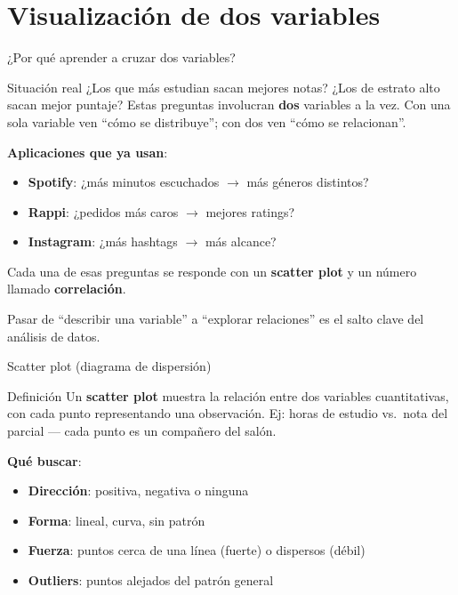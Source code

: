 \documentclass[aspectratio=169, 11pt]{beamer}
\begin{document}
\section{Visualización de dos variables}

\begin{frame}{¿Por qué aprender a cruzar dos variables?}
\begin{exampleblock}{Situación real}
¿Los que m\'as estudian sacan mejores notas? ¿Los de estrato alto sacan mejor puntaje?
Estas preguntas involucran \textbf{dos} variables a la vez.
Con una sola variable ven ``c\'omo se distribuye''; con dos ven ``c\'omo se relacionan''.
\end{exampleblock}

\textbf{Aplicaciones que ya usan}:
\begin{itemize}
\item \textbf{Spotify}: ¿m\'as minutos escuchados $\to$ m\'as g\'eneros distintos?
\item \textbf{Rappi}: ¿pedidos m\'as caros $\to$ mejores ratings?
\item \textbf{Instagram}: ¿m\'as hashtags $\to$ m\'as alcance?
\end{itemize}

\vspace{0.3em}
Cada una de esas preguntas se responde con un \textbf{scatter plot} y un n\'umero llamado \textbf{correlaci\'on}.

\vspace{0.3em}
\alert{Pasar de ``describir una variable'' a ``explorar relaciones'' es el salto clave del an\'alisis de datos.}
\end{frame}

\begin{frame}{Scatter plot (diagrama de dispersión)}
\begin{block}{Definición}
Un \textbf{scatter plot} muestra la relaci\'on entre dos variables cuantitativas, con cada punto representando una observaci\'on. Ej: horas de estudio vs.\ nota del parcial --- cada punto es un compa\~nero del sal\'on.
\end{block}

\textbf{Qu\'e buscar}:
\begin{itemize}
\item \textbf{Dirección}: positiva, negativa o ninguna
\item \textbf{Forma}: lineal, curva, sin patrón
\item \textbf{Fuerza}: puntos cerca de una línea (fuerte) o dispersos (débil)
\item \textbf{Outliers}: puntos alejados del patrón general
\end{itemize}
\end{frame}
\end{document}
